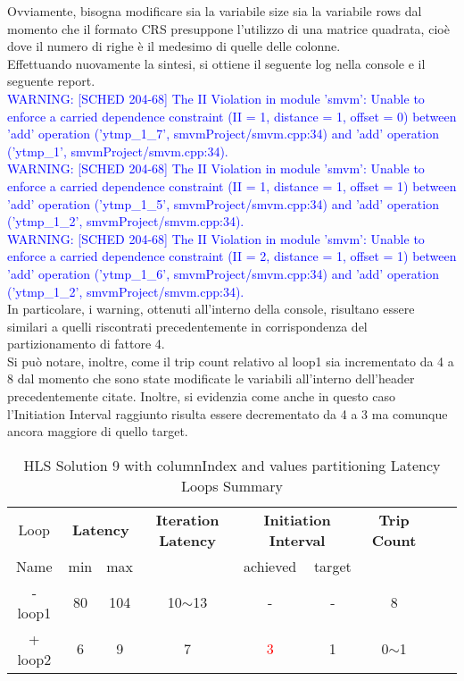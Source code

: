 Ovviamente, bisogna modificare sia la variabile size sia la variabile rows dal momento che il formato CRS presuppone l'utilizzo di una matrice quadrata, cioè dove il numero di righe è il medesimo di quelle delle colonne.
\\
Effettuando nuovamente la sintesi, si ottiene il seguente log nella console e il seguente report.
\\
\textcolor{blue}{WARNING: [SCHED 204-68] The II Violation in module 'smvm': Unable to enforce a carried dependence constraint (II = 1, distance = 1, offset = 0)
	between 'add' operation ('ytmp\_1\_7', smvmProject/smvm.cpp:34) and 'add' operation ('ytmp\_1', smvmProject/smvm.cpp:34).}
\\
\textcolor{blue}{WARNING: [SCHED 204-68] The II Violation in module 'smvm': Unable to enforce a carried dependence constraint (II = 1, distance = 1, offset = 1)
	between 'add' operation ('ytmp\_1\_5', smvmProject/smvm.cpp:34) and 'add' operation ('ytmp\_1\_2', smvmProject/smvm.cpp:34).}
\\
\textcolor{blue}{WARNING: [SCHED 204-68] The II Violation in module 'smvm': Unable to enforce a carried dependence constraint (II = 2, distance = 1, offset = 1)
	between 'add' operation ('ytmp\_1\_6', smvmProject/smvm.cpp:34) and 'add' operation ('ytmp\_1\_2', smvmProject/smvm.cpp:34).}
\\
In particolare, i warning, ottenuti all'interno della console, risultano essere similari a quelli riscontrati precedentemente in corrispondenza del partizionamento di fattore 4.
\\
Si può notare, inoltre, come il trip count relativo al loop1 sia incrementato da 4 a 8 dal momento che sono state modificate le variabili all'interno dell'header precedentemente citate. Inoltre, si evidenzia come anche in questo caso l'Initiation Interval raggiunto risulta essere decrementato da 4 a 3 ma comunque ancora maggiore di quello target. 

\begin{table}[H]
	\centering
	\begin{tabular}{|c|c|c|c|c|c|c|c|c|}
		\hline
		\multicolumn{1}{|c|}{Loop} & \multicolumn{2}{|c|}{\textbf{Latency}} & \multicolumn{1}{c|}{\textbf{Iteration Latency}} & \multicolumn{2}{c|}{\textbf{Initiation Interval}} & \multicolumn{1}{c|}{\textbf{Trip Count}}  \\
		Name & min & max &  & achieved & target &  \\
		\hline
		- loop1 & 80 & 104 & 10$\sim$13 & - & - & 8 \\
		+ loop2 & 6 & 9 & 7 & \textcolor{red}{3} & 1 & 0$\sim$1 \\
		\hline
	\end{tabular}
	\caption{HLS Solution 9 with columnIndex and values partitioning Latency Loops Summary}
	\label{tab:hls-solution-9-columnindex-values-partitioning-loop-summary}
\end{table}

